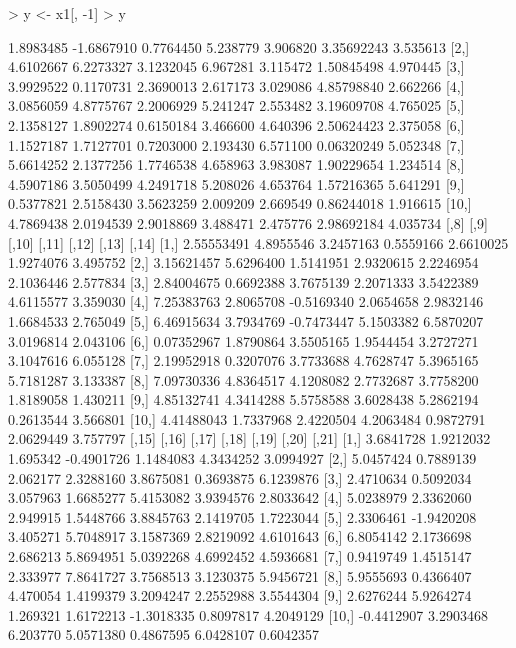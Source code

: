 \documentclass[12pt]{article}
\begin{document}
\begin{Schunk}
\begin{Sinput}
> y <- x1[, -1] 
> y
\end{Sinput}
\begin{Soutput}
           [,1]       [,2]      [,3]     [,4]     [,5]       [,6]     [,7]
 [1,] 1.8983485 -1.6867910 0.7764450 5.238779 3.906820 3.35692243 3.535613
 [2,] 4.6102667  6.2273327 3.1232045 6.967281 3.115472 1.50845498 4.970445
 [3,] 3.9929522  0.1170731 2.3690013 2.617173 3.029086 4.85798840 2.662266
 [4,] 3.0856059  4.8775767 2.2006929 5.241247 2.553482 3.19609708 4.765025
 [5,] 2.1358127  1.8902274 0.6150184 3.466600 4.640396 2.50624423 2.375058
 [6,] 1.1527187  1.7127701 0.7203000 2.193430 6.571100 0.06320249 5.052348
 [7,] 5.6614252  2.1377256 1.7746538 4.658963 3.983087 1.90229654 1.234514
 [8,] 4.5907186  3.5050499 4.2491718 5.208026 4.653764 1.57216365 5.641291
 [9,] 0.5377821  2.5158430 3.5623259 2.009209 2.669549 0.86244018 1.916615
[10,] 4.7869438  2.0194539 2.9018869 3.488471 2.475776 2.98692184 4.035734
            [,8]      [,9]      [,10]     [,11]     [,12]     [,13]    [,14]
 [1,] 2.55553491 4.8955546  3.2457163 0.5559166 2.6610025 1.9274076 3.495752
 [2,] 3.15621457 5.6296400  1.5141951 2.9320615 2.2246954 2.1036446 2.577834
 [3,] 2.84004675 0.6692388  3.7675139 2.2071333 3.5422389 4.6115577 3.359030
 [4,] 7.25383763 2.8065708 -0.5169340 2.0654658 2.9832146 1.6684533 2.765049
 [5,] 6.46915634 3.7934769 -0.7473447 5.1503382 6.5870207 3.0196814 2.043106
 [6,] 0.07352967 1.8790864  3.5505165 1.9544454 3.2727271 3.1047616 6.055128
 [7,] 2.19952918 0.3207076  3.7733688 4.7628747 5.3965165 5.7181287 3.133387
 [8,] 7.09730336 4.8364517  4.1208082 2.7732687 3.7758200 1.8189058 1.430211
 [9,] 4.85132741 4.3414288  5.5758588 3.6028438 5.2862194 0.2613544 3.566801
[10,] 4.41488043 1.7337968  2.4220504 4.2063484 0.9872791 2.0629449 3.757797
           [,15]      [,16]    [,17]      [,18]      [,19]     [,20]     [,21]
 [1,]  3.6841728  1.9212032 1.695342 -0.4901726  1.1484083 4.3434252 3.0994927
 [2,]  5.0457424  0.7889139 2.062177  2.3288160  3.8675081 0.3693875 6.1239876
 [3,]  2.4710634  0.5092034 3.057963  1.6685277  5.4153082 3.9394576 2.8033642
 [4,]  5.0238979  2.3362060 2.949915  1.5448766  3.8845763 2.1419705 1.7223044
 [5,]  2.3306461 -1.9420208 3.405271  5.7048917  3.1587369 2.8219092 4.6101643
 [6,]  6.8054142  2.1736698 2.686213  5.8694951  5.0392268 4.6992452 4.5936681
 [7,]  0.9419749  1.4515147 2.333977  7.8641727  3.7568513 3.1230375 5.9456721
 [8,]  5.9555693  0.4366407 4.470054  1.4199379  3.2094247 2.2552988 3.5544304
 [9,]  2.6276244  5.9264274 1.269321  1.6172213 -1.3018335 0.8097817 4.2049129
[10,] -0.4412907  3.2903468 6.203770  5.0571380  0.4867595 6.0428107 0.6042357

\end{Soutput}
\end{Schunk}
\end{document}
